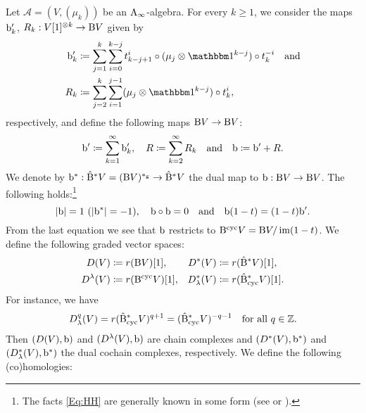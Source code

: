 \documentclass[\MainFolder/Text.tex]{subfiles}
\begin{document}
\begin{Definition}\label{Def:CycHom}
Let $\mathcal{A}=(V,(\mu_k))$ be an $\mathrm{A}_\infty$-algebra. For every $k\ge 1$, we consider the maps $\mathrm{b}'_k$, $R_k: V[1]^{\otimes k} \rightarrow \mathrm{B} V$ given by 
\begin{equation}\label{Eq:bRH} \begin{aligned}\Hd'_k & \coloneqq \sum_{j=1}^k \sum_{i=0}^{k-j} t^i_{k-j+1}\circ(\mu_j \otimes \Id^{k-j})\circ t_k^{-i}\quad\text{and}\\
R_k &\coloneqq \sum_{j=2}^k \sum_{i=1}^{j-1} (\mu_j\otimes \Id^{k-j})\circ t_k^{i}, \end{aligned}
\end{equation}
respectively, and define the following maps $\mathrm{B} V \rightarrow \mathrm{B} V$:
\begin{equation*}
\mathrm{b}'\coloneqq \sum_{k=1}^{\infty} \mathrm{b}'_k, \quad R\coloneqq \sum_{k=2}^\infty R_k\quad\text{and}\quad \mathrm{b}\coloneqq \mathrm{b}' + R.
\end{equation*}
We denote by $\mathrm{b}^*: \hat{\mathrm{B}}^* V = (\mathrm{B} V)^{*_{\mathrm{g}}} \rightarrow \hat{\mathrm{B}}^* V$ the dual map to $\mathrm{b}: \mathrm{B} V \rightarrow \mathrm{B} V$.  The following holds:\footnote{The facts \eqref{Eq:HH} are generally known in some form (see \cite{Mescher2016} or \cite{Lazarev2003}).}
\begin{equation} \label{Eq:HH}
|\mathrm{b}| = 1\ (|\mathrm{b}^*|=-1), \quad \mathrm{b}\circ \mathrm{b} = 0 \quad\text{and}\quad \mathrm{b}(1-t) = (1-t)\mathrm{b}'.
\end{equation} 
From the last equation we see that $\mathrm{b}$ restricts to $\mathrm{B}^{\mathrm{cyc}} V = \mathrm{B} V / \operatorname{im}(1-t)$.
We define the following graded vector spaces:
$$\begin{aligned}
D(V) &\coloneqq r(\mathrm{B} V)[1], & D^*(V) &\coloneqq r(\hat{\mathrm{B}}^* V)[1], \\ D^\lambda(V) &\coloneqq r(\mathrm{B}^{\mathrm{cyc}} V)[1], & D_\lambda^*(V) &\coloneqq r(\hat{\mathrm{B}}_{\mathrm{cyc}}^* V)[1]. \end{aligned}$$
For instance, we have
$$ D_\lambda^q(V) = r(\hat{\mathrm{B}}_{\mathrm{cyc}}^* V)^{q+1} = (\hat{\mathrm{B}}_{\mathrm{cyc}}^* V)^{-q-1}\quad \text{for all } q\in \mathbb{Z}.$$
Then $(D(V),\mathrm{b})$ and $(D^\lambda(V),\mathrm{b})$ are chain complexes and $(D^*(V),\mathrm{b}^*)$ and $(D_\lambda^*(V),\mathrm{b}^*)$ the dual cochain complexes, respectively. We define the following (co)homologies:

\end{Definition}
\end{document}
